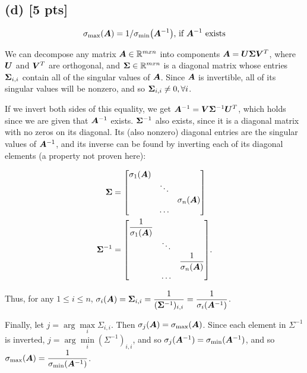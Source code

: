\documentclass[twoside,10pt]{article}
\begin{document}
\subsection*{(d) [5 pts]}
  \begin{equation*}
    \sigma_{\mathrm{max}}\left(\mtx{A}\right) = 1 / \sigma_{\mathrm{min}}\left(\mtx{A}^{-1}\right)\text{, if $\mtx{A}^{-1}$ exists}
  \end{equation*}

  We can decompose any matrix $\bm{A} \in \mathbb{R}^{mxn}$ into components $\bm{A} = \bm{U} \bm{\Sigma} \bm{V}^T$, where $\bm{U}$ and $\bm{V}^T$ are orthogonal, and $\bm{\Sigma} \in \mathbb{R}^{mxn}$ is a diagonal matrix whose entries $\bm{\Sigma}_{i,i}$ contain all of the singular values of $\bm{A}$.
  Since $\bm{A}$ is invertible, all of its singular values will be nonzero, and so $\bm{\Sigma}_{i,i} \neq 0, \forall i$.

  If we invert both sides of this equality, we get $\bm{A}^{-1} = \bm{V} \bm{\Sigma}^{-1} \bm{U}^T$, which holds since we are given that $\bm{A}^{-1}$ exists.
  $\bm{\Sigma}^{-1}$ also exists, since it is a diagonal matrix with no zeros on its diagonal.
  Its (also nonzero) diagonal entries are the singular values of $\bm{A}^{-1}$, and its inverse can be found by inverting each of its diagonal elements (a property not proven here):

  \begin{align*}
    \mtx{\Sigma} &=
    \begin{bmatrix}
      \sigma_{1}(\mtx{A}) &  & \\ 
      & \ddots & \\ 
      &  & \sigma_{n}(\mtx{A})\\
      & \dots
    \end{bmatrix}\\
    \mtx{\Sigma}^{-1} &=
    \begin{bmatrix}
      \dfrac{1}{\sigma_{1}(\mtx{A})} &  & \\ 
      & \ddots & \\ 
      &  & \dfrac{1}{\sigma_{n}(\mtx{A})}\\
      & \dots
    \end{bmatrix}.
  \end{align*}

  Thus, for any $1 \leq i \leq n$, $\sigma_i(\bm{A}) = \bm{\Sigma}_{i,i} = \dfrac{1}{(\bm{\Sigma}^{-1})_{i,i}} = \dfrac{1}{\sigma_i(\bm{A}^{-1})}$.

  Finally, let $j = \arg\!\max\limits_{i}{\Sigma_{i,i}}$.
  Then $\sigma_j(\bm{A}) = \sigma_{\mathrm{max}}(\bm{A})$.
  Since each element in $\Sigma^{-1}$ is inverted, $j = \arg\!\min\limits_{i}{(\Sigma^{-1})_{i,i}}$, and so $\sigma_j(\bm{A}^{-1}) = \sigma_{\mathrm{min}}(\bm{A}^{-1})$, and so $\sigma_{\mathrm{max}}\left(\mtx{A}\right) = \dfrac{1}{\sigma_{\mathrm{min}}\left(\mtx{A}^{-1}\right)}$.
\end{document}
